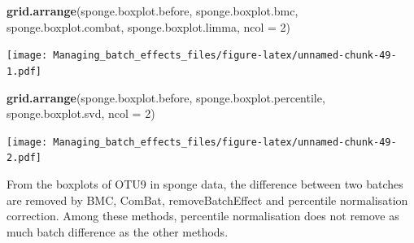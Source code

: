 \documentclass[]{book}
\newenvironment{Shaded}{\begin{snugshade}}{\end{snugshade}}
\newcommand{\KeywordTok}[1]{\textcolor[rgb]{0.13,0.29,0.53}{\textbf{#1}}}
\newcommand{\DataTypeTok}[1]{\textcolor[rgb]{0.13,0.29,0.53}{#1}}
\newcommand{\DecValTok}[1]{\textcolor[rgb]{0.00,0.00,0.81}{#1}}
\newcommand{\NormalTok}[1]{#1}
\begin{document}
\begin{Shaded}
\begin{Highlighting}[]
\KeywordTok{grid.arrange}\NormalTok{(sponge.boxplot.before, sponge.boxplot.bmc, }
\NormalTok{             sponge.boxplot.combat, sponge.boxplot.limma, }\DataTypeTok{ncol =} \DecValTok{2}\NormalTok{)}
\end{Highlighting}
\end{Shaded}

\texttt{[image: Managing\_batch\_effects\_files/figure-latex/unnamed-chunk-49-1.pdf]}

\begin{Shaded}
\begin{Highlighting}[]
\KeywordTok{grid.arrange}\NormalTok{(sponge.boxplot.before, sponge.boxplot.percentile, }
\NormalTok{             sponge.boxplot.svd, }\DataTypeTok{ncol =} \DecValTok{2}\NormalTok{)}
\end{Highlighting}
\end{Shaded}

\texttt{[image: Managing\_batch\_effects\_files/figure-latex/unnamed-chunk-49-2.pdf]}

From the boxplots of OTU9 in sponge data, the difference between two
batches are removed by BMC, ComBat, removeBatchEffect and percentile
normalisation correction. Among these methods, percentile normalisation
does not remove as much batch difference as the other methods.
\end{document}
